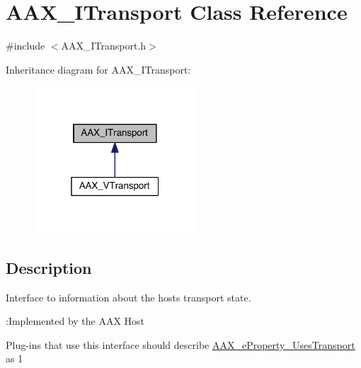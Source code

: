 \hypertarget{a00116}{}\section{A\+A\+X\+\_\+\+I\+Transport Class Reference}
\label{a00116}


{\ttfamily \#include $<$A\+A\+X\+\_\+\+I\+Transport.\+h$>$}



Inheritance diagram for A\+A\+X\+\_\+\+I\+Transport\+:
\nopagebreak
\begin{figure}[H]
\begin{center}
\leavevmode
\includegraphics[width=172pt]{a00666}
\end{center}
\end{figure}


\subsection{Description}
Interface to information about the host\textquotesingle{}s transport state. 

\begin{DoxyRefDesc}{\+:\+Implemented by the A\+A\+X Host}
\item[\hyperlink{a00001__aax_host_implementation000012}{\+:\+Implemented by the A\+A\+X Host}]\end{DoxyRefDesc}


Plug-\/ins that use this interface should describe \hyperlink{a00283_a6571f4e41a5dd06e4067249228e2249eaf3e1162c5f517595589d513d48158dbd}{A\+A\+X\+\_\+e\+Property\+\_\+\+Uses\+Transport} as 1

